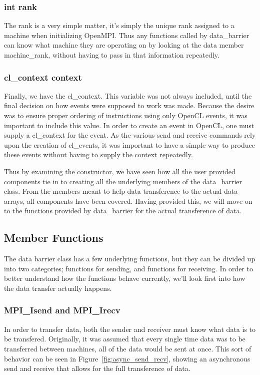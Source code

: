 \documentclass[../thesis.tex]{subfiles}
\begin{document}
  \subsubsection{int rank} %
  \label{ssub:int_rank}
    The rank is a very simple matter, it's simply the unique rank assigned to a machine when initializing OpenMPI. Thus any functions called by data\_barrier can know what machine they are operating on by looking at the data member machine\_rank, without having to pass in that information repeatedly.

  \subsubsection{cl\_context context} %
  \label{ssub:cl_context_context}
    Finally, we have the cl\_context. This variable was not always included, until the final decision on how events were supposed to work was made. Because the desire was to ensure proper ordering of instructions using only OpenCL events, it was important to include this value. In order to create an event in OpenCL, one must supply a cl\_context for the event. As the various send and receive commands rely upon the creation of cl\_events, it was important to have a simple way to produce these events without having to supply the context repeatedly.

  Thus by examining the constructor, we have seen how all the user provided components tie in to creating all the underlying members of the data\_barrier class. From the members meant to help data transference to the actual data arrays, all components have been covered. Having provided this, we will move on to the functions provided by data\_barrier for the actual transference of data.

\subsection{Member Functions} %
\label{sub:member_functions}
  The data barrier class has a few underlying functions, but they can be divided up into two categories; functions for sending, and functions for receiving. In order to better understand how the functions behave currently, we'll look first into how the data transfer actually happens.

  \subsubsection{MPI\_Isend and MPI\_Irecv} %
  \label{ssub:mpisend_and_mpi_recv}
    In order to transfer data, both the sender and receiver must know what data is to be transfered. Originally, it was assumed that every single time data was to be transferred between machines, all of the data would be sent at once. This sort of behavior can be seen in Figure~\ref{fig:async_send_recv}, showing an asynchronous send and receive that allows for the full transference of data.
\end{document}

